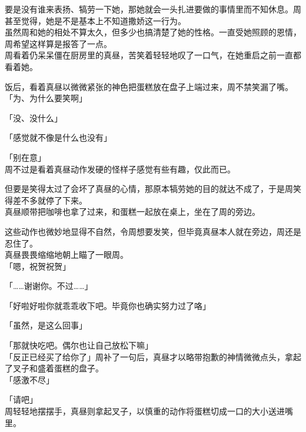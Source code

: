 要是没有谁来表扬、犒劳一下她，那她就会一头扎进要做的事情里而不知休息。周甚至觉得，她是不是基本上不知道撒娇这一行为。\\

虽然周和她的相处不算太久，但多少也搞清楚了她的性格。一直受她照顾的恩情，周希望这样算是报答了一点。\\

周看着仍呆呆僵在厨房里的真昼，苦笑着轻轻地叹了一口气，在她重启之前一直都看着她。\\

\vspace{2\baselineskip}

饭后，看着真昼以微微紧张的神色把蛋糕放在盘子上端过来，周不禁笑漏了嘴。\\

「为、为什么要笑啊」

「没、没什么」

「感觉就不像是什么也没有」

「别在意」\\

周不过是看着真昼动作发硬的怪样子感觉有些有趣，仅此而已。

但要是笑得太过了会坏了真昼的心情，那原本犒劳她的目的就达不成了，于是周笑得差不多就停了下来。\\

真昼顺带把咖啡也拿了过来，和蛋糕一起放在桌上，坐在了周的旁边。

这些动作也微妙地显得不自然，令周想要发笑，但毕竟真昼本人就在旁边，周还是忍住了。\\

真昼畏畏缩缩地朝上瞄了一眼周。\\

「嗯，祝贺祝贺」

「……谢谢你。不过……」

「好啦好啦你就乖乖收下吧。毕竟你也确实努力过了咯」

「虽然，是这么回事」

「那就快吃吧。偶尔也让自己放松下嘛」\\

「反正已经买了给你了」周补了一句后，真昼才以略带抱歉的神情微微点头，拿起了叉子和盛着蛋糕的盘子。\\

「感激不尽」

「请吧」\\

周轻轻地摆摆手，真昼则拿起叉子，以慎重的动作将蛋糕切成一口的大小送进嘴里。\\

